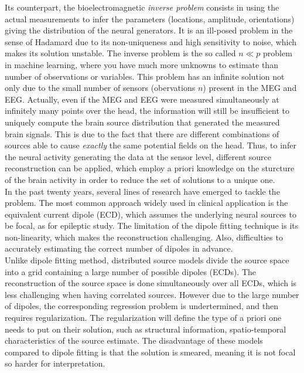 Its counterpart, the bioelectromagnetic \textit{inverse problem} consists in using the actual measurements to infer the parameters (locations, amplitude, orientations) giving the distribution of the neural generators. It is an ill-posed problem in the sense of Hadamard due to its non-uniqueness and high sensitivity to noise, which makes its solution unstable. The inverse problem is the so called $n \ll p$ problem in machine learning, where you have much more unknowns to estimate than number of observations or variables. This problem has an infinite solution not only due to the small number of sensors (obervations $n$) present in the MEG and EEG. Actually, even if the MEG and EEG were measured simultaneously at infinitely many points over the head, the information will still be insufficient to uniquely compute the brain source distribution that generated the measured brain signals. This is due to the fact that there are different combinations of sources able to cause \textit{exactly} the same potential fields on the head. Thus, to infer the neural activity generating the data at the sensor level, different source reconstruction can be applied, which employ a priori knowledge on the sturcture of the brain activity in order to reduce the set of solutions to a unique one.\\

In the past twenty years, several lines of research have emerged to tackle the problem. The most common approach widely used in clinical application is the equivalent current dipole (ECD), which assumes the underlying neural sources to be focal, as for epileptic study. The limitation of the dipole fitting technique is its non-linearity, which makes the reconstruction challenging. Also, difficulties to accurately estimating the correct number of dipoles in advance. \\

Unlike dipole fitting method, distributed source models divide the source space into a grid containing a large number of possible dipoles (ECDs). The reconstruction of the source space is done simultaneously over all ECDs, which is less challenging when having correlated sources. However due to the large number of dipoles, the corresponding regression problem is undertermined, and then requires regularization. The regularization will define the type of a priori one needs to put on their solution, such as structural information, spatio-temporal characteristics of the source estimate. The disadvantage of these models compared to dipole fitting is that the solution is smeared, meaning it is not focal so harder for interpretation.\\
 
